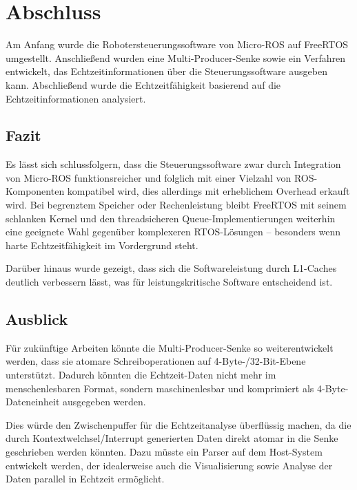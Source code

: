 \section{Abschluss}

Am Anfang wurde die Robotersteuerungssoftware von Micro-ROS auf FreeRTOS
umgestellt. Anschließend wurden eine Multi-Producer-Senke sowie ein Verfahren
entwickelt, das Echtzeitinformationen über die Steuerungssoftware ausgeben kann.
Abschließend wurde die Echtzeitfähigkeit basierend auf die Echtzeitinformationen
analysiert.

\subsection{Fazit}

Es lässt sich schlussfolgern, dass die Steuerungssoftware zwar durch Integration
von Micro-ROS funktionsreicher und folglich mit einer Vielzahl von
ROS-Komponenten kompatibel wird, dies allerdings mit erheblichem Overhead
erkauft wird. Bei begrenztem Speicher oder Rechenleistung bleibt FreeRTOS mit
seinem schlanken Kernel und den threadsicheren Queue-Implementierungen weiterhin
eine geeignete Wahl gegenüber komplexeren RTOS-Lösungen -- besonders wenn harte
Echtzeitfähigkeit im Vordergrund steht.

Darüber hinaus wurde gezeigt, dass sich die Softwareleistung durch L1-Caches
deutlich verbessern lässt, was für leistungskritische Software entscheidend ist.

\subsection{Ausblick}

Für zukünftige Arbeiten könnte die Multi-Producer-Senke so weiterentwickelt
werden, dass sie atomare Schreiboperationen auf 4-Byte-/32-Bit-Ebene
unterstützt. Dadurch könnten die Echtzeit-Daten nicht mehr im menschenlesbaren
Format, sondern maschinenlesbar und komprimiert als 4-Byte-Dateneinheit
ausgegeben werden.

Dies würde den Zwischenpuffer für die Echtzeitanalyse überflüssig machen, da die
durch Kontextwelchsel/Interrupt generierten Daten direkt atomar in die Senke
geschrieben werden könnten. Dazu müsste ein Parser auf dem Host-System
entwickelt werden, der idealerweise auch die Visualisierung sowie Analyse der
Daten parallel in Echtzeit ermöglicht.
